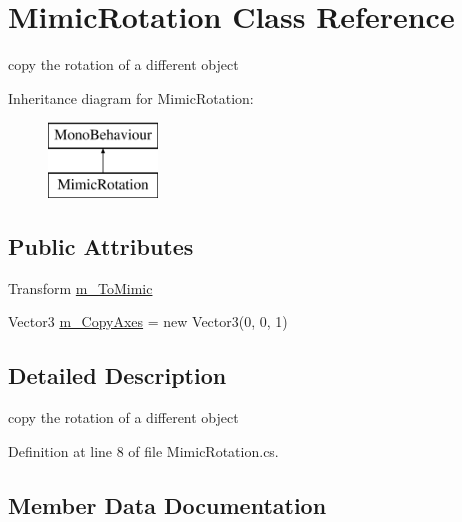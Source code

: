 \hypertarget{class_mimic_rotation}{}\section{Mimic\+Rotation Class Reference}
\label{class_mimic_rotation}


copy the rotation of a different object  


Inheritance diagram for Mimic\+Rotation\+:\begin{figure}[H]
\begin{center}
\leavevmode
\includegraphics[height=2.000000cm]{class_mimic_rotation}
\end{center}
\end{figure}
\subsection*{Public Attributes}
\begin{DoxyCompactItemize}
\item 
Transform \mbox{\hyperlink{class_mimic_rotation_aceb458accbca1a008cf80a6368fad37e}{m\+\_\+\+To\+Mimic}}
\item 
Vector3 \mbox{\hyperlink{class_mimic_rotation_ae2d78c0a1986d5f597489f9bc802e0c7}{m\+\_\+\+Copy\+Axes}} = new Vector3(0, 0, 1)
\end{DoxyCompactItemize}


\subsection{Detailed Description}
copy the rotation of a different object 



Definition at line 8 of file Mimic\+Rotation.\+cs.



\subsection{Member Data Documentation}
\mbox{\label{class_mimic_rotation_ae2d78c0a1986d5f597489f9bc802e0c7}} 
